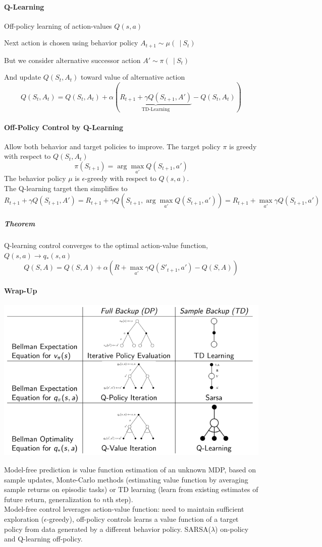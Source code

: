 \documentclass[10pt]{report}
\begin{document}
\paragraph{Q-Learning} Off-policy learning of action-values $Q(s,a)$
\begin{list}{}{}
	\item Next action is chosen using behavior policy $A_{t+1}\sim \mu(\:\:|\:S_t)$
	\item But we consider alternative successor action $A'\sim\pi(\:\:|\:S_t)$
	\item And update $Q(S_t,A_t)$ toward value of alternative action
	$$Q(S_t,A_t) = Q(S_t,A_t) + \alpha(\underset{\text{TD-Learning}}{\underbrace{R_{t+1} + \gamma Q(S_{t+1},A')}} - Q(S_t,A_t))$$
\end{list}
\paragraph{Off-Policy Control by Q-Learning} Allow both behavior and target policies to improve. The target policy $\pi$ is greedy with respect to $Q(S_t,A_t)$
$$\pi(S_{t+1})=\arg\max_{a'} Q(S_{t+1}, a')$$
The behavior policy $\mu$ is $\epsilon$-greedy with respect to $Q(s,a)$.\\
The Q-learning target then simplifies to
$$R_{t+1}+\gamma Q(S_{t+1}, A') = R_{t+1} + \gamma Q(S_{t+1}, \arg\max_{a'} Q(S_{t+1}, a'))= R_{t+1} + \max_{a'} \gamma Q(S_{t+1}, a')$$
\subparagraph{Theorem} Q-learning control converges to the optimal action-value function, $Q(s,a)\rightarrow q_*(s,a)$
$$Q(S,A) = Q(S,A) + \alpha(R + \max_{a'} \gamma Q(S'_{t+1}, a') - Q(S,A))$$
\paragraph{Wrap-Up}
\begin{center}
	\includegraphics[scale=0.5]{175.png}
\end{center}
Model-free prediction is value function estimation of an unknown MDP, based on sample updates, Monte-Carlo methods (estimating value function by averaging sample returns on episodic tasks) or TD learning (learn from existing estimates of future return, generalization to $n$th step).\\
Model-free control leverages action-value function: need to maintain sufficient exploration ($\epsilon$-greedy), off-policy controls learns a value function of a target policy from data generated by a different behavior policy. SARSA($\lambda$) on-policy and Q-learning off-policy.
\end{document}
